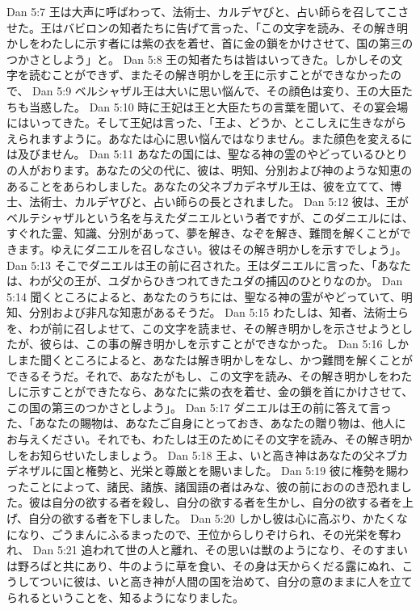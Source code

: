 Dan 5:7  王は大声に呼ばわって、法術士、カルデヤびと、占い師らを召してこさせた。王はバビロンの知者たちに告げて言った、「この文字を読み、その解き明かしをわたしに示す者には紫の衣を着せ、首に金の鎖をかけさせて、国の第三のつかさとしよう」と。
Dan 5:8  王の知者たちは皆はいってきた。しかしその文字を読むことができず、またその解き明かしを王に示すことができなかったので、
Dan 5:9  ベルシャザル王は大いに思い悩んで、その顔色は変り、王の大臣たちも当惑した。
Dan 5:10  時に王妃は王と大臣たちの言葉を聞いて、その宴会場にはいってきた。そして王妃は言った、「王よ、どうか、とこしえに生きながらえられますように。あなたは心に思い悩んではなりません。また顔色を変えるには及びません。
Dan 5:11  あなたの国には、聖なる神の霊のやどっているひとりの人がおります。あなたの父の代に、彼は、明知、分別および神のような知恵のあることをあらわしました。あなたの父ネブカデネザル王は、彼を立てて、博士、法術士、カルデヤびと、占い師らの長とされました。
Dan 5:12  彼は、王がベルテシャザルという名を与えたダニエルという者ですが、このダニエルには、すぐれた霊、知識、分別があって、夢を解き、なぞを解き、難問を解くことができます。ゆえにダニエルを召しなさい。彼はその解き明かしを示すでしょう」。
Dan 5:13  そこでダニエルは王の前に召された。王はダニエルに言った、「あなたは、わが父の王が、ユダからひきつれてきたユダの捕囚のひとりなのか。
Dan 5:14  聞くところによると、あなたのうちには、聖なる神の霊がやどっていて、明知、分別および非凡な知恵があるそうだ。
Dan 5:15  わたしは、知者、法術士らを、わが前に召しよせて、この文字を読ませ、その解き明かしを示させようとしたが、彼らは、この事の解き明かしを示すことができなかった。
Dan 5:16  しかしまた聞くところによると、あなたは解き明かしをなし、かつ難問を解くことができるそうだ。それで、あなたがもし、この文字を読み、その解き明かしをわたしに示すことができたなら、あなたに紫の衣を着せ、金の鎖を首にかけさせて、この国の第三のつかさとしよう」。
Dan 5:17  ダニエルは王の前に答えて言った、「あなたの賜物は、あなたご自身にとっておき、あなたの贈り物は、他人にお与えください。それでも、わたしは王のためにその文字を読み、その解き明かしをお知らせいたしましょう。
Dan 5:18  王よ、いと高き神はあなたの父ネブカデネザルに国と権勢と、光栄と尊厳とを賜いました。
Dan 5:19  彼に権勢を賜わったことによって、諸民、諸族、諸国語の者はみな、彼の前におののき恐れました。彼は自分の欲する者を殺し、自分の欲する者を生かし、自分の欲する者を上げ、自分の欲する者を下しました。
Dan 5:20  しかし彼は心に高ぶり、かたくなになり、ごうまんにふるまったので、王位からしりぞけられ、その光栄を奪われ、
Dan 5:21  追われて世の人と離れ、その思いは獣のようになり、そのすまいは野ろばと共にあり、牛のように草を食い、その身は天からくだる露にぬれ、こうしてついに彼は、いと高き神が人間の国を治めて、自分の意のままに人を立てられるということを、知るようになりました。
